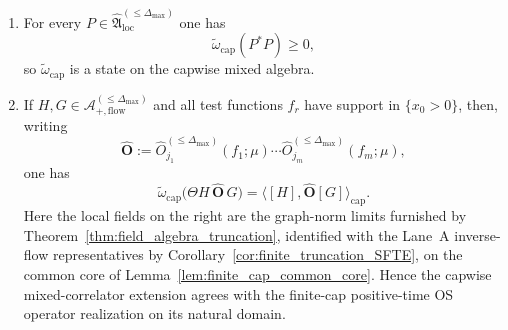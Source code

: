 \begin{theorem}
\begin{enumerate}[label=(\roman*),leftmargin=2.3em]
$\widehat{\mathfrak A}_{\mathrm{loc}}^{(\le \Delta_{\max})}$ extending the compatible finite-family package limits
$\omega_{\mathcal W,\mathrm{cap,bnd}}^{(u_{\mathrm{ren}})}$ furnished by Corollary~\ref{cor:finite_cap_mixed_family_packaging}.
In particular,
\[
\widetilde\omega_{\mathrm{cap}}\!\restriction_{\mathcal A_{\mathrm{flow}}^{(\le \Delta_{\max})}}
=
\omega_{\mathrm{flow}}^{(u_{\mathrm{ren}})}\!\restriction_{\mathcal A_{\mathrm{flow}}^{(\le \Delta_{\max})}}
\qquad\text{and}\qquad
\widetilde\omega_{\mathrm{cap}}\!\restriction_{\mathcal A_+}
=
\omega_{\mathrm{bd}}^{(u_{\mathrm{ren}})}.
\]
\item For every $P\in\widehat{\mathfrak A}_{\mathrm{loc}}^{(\le \Delta_{\max})}$ one has
\[
\widetilde\omega_{\mathrm{cap}}(P^\ast P)\ge 0,
\]
so $\widetilde\omega_{\mathrm{cap}}$ is a state on the capwise mixed algebra.
\item If $H,G\in\mathcal A_{+,\mathrm{flow}}^{(\le \Delta_{\max})}$ and all test functions $f_r$ have support in $\{x_0>0\}$, then, writing
\[
\widehat{\mathbf O}
:=
\widehat O_{j_1}^{(\le \Delta_{\max})}(f_1;\mu)\cdots
\widehat O_{j_m}^{(\le \Delta_{\max})}(f_m;\mu),
\]
one has
\[
\widetilde\omega_{\mathrm{cap}}\bigl(\Theta H\,\widehat{\mathbf O}\,G\bigr)
=
\big\langle [H],\widehat{\mathbf O}[G]\big\rangle_{\mathrm{cap}}.
\]
Here the local fields on the right are the graph-norm limits furnished by
Theorem~\ref{thm:field_algebra_truncation}, identified with the Lane~A inverse-flow representatives by
Corollary~\ref{cor:finite_truncation_SFTE}, on the common core of
Lemma~\ref{lem:finite_cap_common_core}.
Hence the capwise mixed-correlator extension agrees with the finite-cap positive-time OS operator realization on its natural domain.
\end{enumerate}
\end{theorem}

